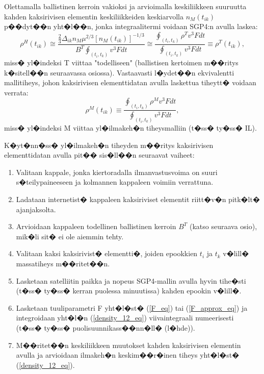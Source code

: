 \documentclass[12pt,a4paper,finnish,margin=2in]{article}
\begin{document}
Olettamalla ballistinen kerroin vakioksi ja arvioimalla keskiliikkeen suuruutta kahden kaksirivisen elementin keskiliikkeiden keskiarvolla $n_M(t_{ik})$ p��dyt��n yht�l��n, jonka integraalitermi voidaan SGP4:n avulla laskea:
\begin{equation} \label{density_12_eq}
\rho^H(t_{ik}) \cong  \frac{\frac{2}{3} \Delta_{ik}n_M \mu^{2/3} \left [ n_M(t_{ik}) \right ]^{-1/3}}{B^T \oint_{(t_i,t_k)}  v^3 F dt}  \cong \frac{\oint_{(t_i,t_k)} \rho^T v^3 F dt}{\oint_{(t_i,t_k)}  v^3 F dt} \equiv \rho^T(t_{ik}),
\end{equation}
miss� yl�indeksi T viittaa "todelliseen" (ballistisen kertoimen m��ritys k�sitell��n seuraavassa osiossa). Vastaavasti l�ydet��n ekvivalentti mallitiheys, johon kaksirivisen elementtidatan avulla laskettua tiheytt� voidaan verrata:
\begin{equation} \label{density_13_eq}
\rho^M(t_{ik}) \equiv \frac{\oint_{(t_i,t_k)} \rho^M v^3 F dt}{\oint_{(t_i,t_k)}  v^3 F dt},
\end{equation}
miss� yl�indeksi M viittaa yl�ilmakeh�n tiheysmalliin (t�ss� ty�ss� IL).

K�yt�nn�ss� yl�ilmakeh�n tiheyden m��ritys kaksirivisen elementtidatan avulla pit�� sis�ll��n seuraavat vaiheet:
\begin{enumerate}
\item Valitaan kappale, jonka kiertoradalla ilmanvastusvoima on suuri s�teilypaineeseen ja kolmannen kappaleen voimiin verrattuna.
\item Ladataan internetist� \citep{spacetrack} kappaleen kaksiriviset elementit riitt�v�n pitk�lt� ajanjaksolta.
\item Arvioidaan kappaleen todellinen ballistinen kerroin $B^T$ (katso seuraava osio), mik�li sit� ei ole aiemmin tehty.
\item Valitaan kaksi kaksirivist� elementti�, joiden epookkien $t_i$ ja $t_k$ v�lill� massatiheys m��ritet��n. 
\item Lasketaan satelliitin paikka ja nopeus SGP4-mallin avulla hyvin tihe�sti (t�ss� ty�ss� kerran puolessa minuutissa) kahden epookin v�lill�.
\item Lasketaan tuuliparametri F yht�l�st� (\ref{F_eq}) tai (\ref{F_approx_eq}) ja integroidaan yht�l�n (\ref{density_12_eq}) viivaintegraali numeerisesti (t�ss� ty�ss� puolisuunnikass��nn�ll� (l�hde)).
\item M��ritet��n keskiliikkeen muutokset kahden kaksirivisen elementin avulla ja arvioidaan ilmakeh�n keskim��r�inen tiheys yht�l�st� (\ref{density_12_eq}).
\end{enumerate}
\end{document}
